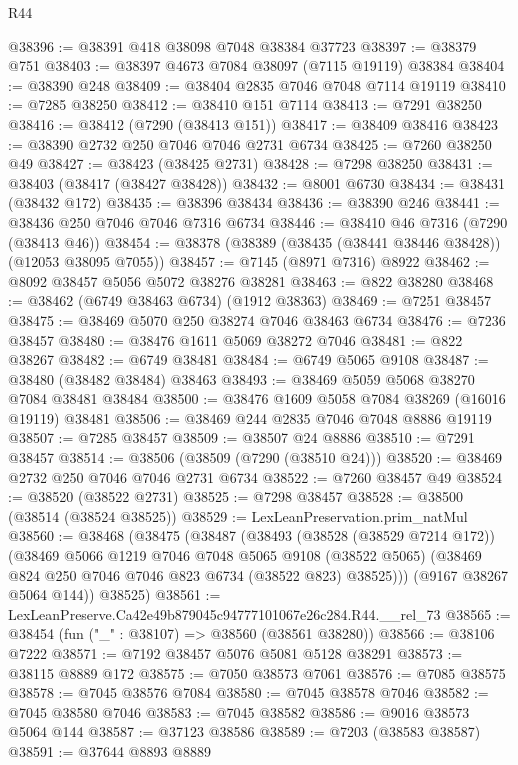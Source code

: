 \begin{lexlean}{R44}
\begin{coremodule}
{@38396 := @38391 @418 @38098 @7048 @38384 @37723
@38397 := @38379 @751
@38403 := @38397 @4673 @7084 @38097 (@7115 @19119) @38384
@38404 := @38390 @248
@38409 := @38404 @2835 @7046 @7048 @7114 @19119
@38410 := @7285 @38250
@38412 := @38410 @151 @7114
@38413 := @7291 @38250
@38416 := @38412 (@7290 (@38413 @151))
@38417 := @38409 @38416
@38423 := @38390 @2732 @250 @7046 @7046 @2731 @6734
@38425 := @7260 @38250 @49
@38427 := @38423 (@38425 @2731)
@38428 := @7298 @38250
@38431 := @38403 (@38417 (@38427 @38428))
@38432 := @8001 @6730
@38434 := @38431 (@38432 @172)
@38435 := @38396 @38434
@38436 := @38390 @246
@38441 := @38436 @250 @7046 @7046 @7316 @6734
@38446 := @38410 @46 @7316 (@7290 (@38413 @46))
@38454 := @38378 (@38389 (@38435 (@38441 @38446 @38428)) (@12053 @38095 @7055))
@38457 := @7145 (@8971 @7316) @8922
@38462 := @8092 @38457 @5056 @5072 @38276 @38281
@38463 := @822 @38280
@38468 := @38462 (@6749 @38463 @6734) (@1912 @38363)
@38469 := @7251 @38457
@38475 := @38469 @5070 @250 @38274 @7046 @38463 @6734
@38476 := @7236 @38457
@38480 := @38476 @1611 @5069 @38272 @7046
@38481 := @822 @38267
@38482 := @6749 @38481
@38484 := @6749 @5065 @9108
@38487 := @38480 (@38482 @38484) @38463
@38493 := @38469 @5059 @5068 @38270 @7084 @38481 @38484
@38500 := @38476 @1609 @5058 @7084 @38269 (@16016 @19119) @38481
@38506 := @38469 @244 @2835 @7046 @7048 @8886 @19119
@38507 := @7285 @38457
@38509 := @38507 @24 @8886
@38510 := @7291 @38457
@38514 := @38506 (@38509 (@7290 (@38510 @24)))
@38520 := @38469 @2732 @250 @7046 @7046 @2731 @6734
@38522 := @7260 @38457 @49
@38524 := @38520 (@38522 @2731)
@38525 := @7298 @38457
@38528 := @38500 (@38514 (@38524 @38525))
@38529 := LexLeanPreservation.prim_natMul
@38560 := @38468
    (@38475
      (@38487
        (@38493
          (@38528 (@38529 @7214 @172))
          (@38469
            @5066
            @1219
            @7046
            @7048
            @5065
            @9108
            (@38522 @5065)
            (@38469 @824 @250 @7046 @7046 @823 @6734 (@38522 @823) @38525)))
        (@9167 @38267 @5064 @144))
      @38525)
@38561 := LexLeanPreserve.Ca42e49b879045c94777101067e26c284.R44.__rel_73
@38565 := @38454 (fun ("_" : @38107) => @38560 (@38561 @38280))
@38566 := @38106 @7222
@38571 := @7192 @38457 @5076 @5081 @5128 @38291
@38573 := @38115 @8889 @172
@38575 := @7050 @38573 @7061
@38576 := @7085 @38575
@38578 := @7045 @38576 @7084
@38580 := @7045 @38578 @7046
@38582 := @7045 @38580 @7046
@38583 := @7045 @38582
@38586 := @9016 @38573 @5064 @144
@38587 := @37123 @38586
@38589 := @7203 (@38583 @38587)
@38591 := @37644 @8893 @8889
}
\end{coremodule}
\end{lexlean}
